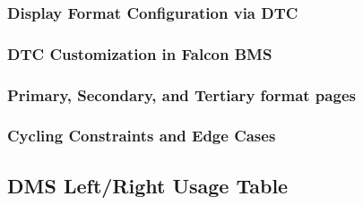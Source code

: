 \documentclass[11pt, a4paper, twoside]{report}
\begin{document}
\subsubsection{Display Format Configuration via DTC}
\label{sec:C3-S4-S2-S1}

\subsubsection{DTC Customization in Falcon BMS}
\label{sec:C3-S4-S2-S2}

\subsubsection{Primary, Secondary, and Tertiary format pages}
\label{sec:C3-S4-S2-S3}

\subsubsection{Cycling Constraints and Edge Cases}
\label{sec:C3-S4-S2-S4}

\subsection{DMS Left/Right Usage Table}
\label{sec:C3-S4-S3}

\newpage

\end{document}
